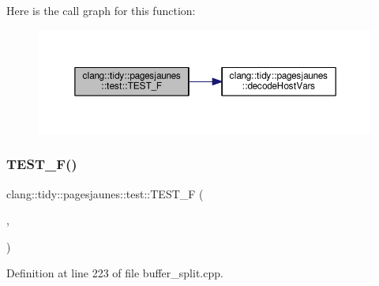 Here is the call graph for this function\+:
\nopagebreak
\begin{figure}[H]
\begin{center}
\leavevmode
\includegraphics[width=350pt]{namespaceclang_1_1tidy_1_1pagesjaunes_1_1test_ab140ea948434f84c1119e3df2cf8fb26_cgraph}
\end{center}
\end{figure}
\mbox{\label{namespaceclang_1_1tidy_1_1pagesjaunes_1_1test_ad1f201f476aa94ca49f994481cb11c99}} 
\subsubsection{\texorpdfstring{T\+E\+S\+T\+\_\+\+F()}{TEST\_F()}\hspace{0.1cm}{\footnotesize\ttfamily [48/57]}}
{\footnotesize\ttfamily clang\+::tidy\+::pagesjaunes\+::test\+::\+T\+E\+S\+T\+\_\+F (\begin{DoxyParamCaption}\item[{\hyperlink{classclang_1_1tidy_1_1pagesjaunes_1_1test_1_1_buffer_split_test}{Buffer\+Split\+Test}}]{,  }\item[{Read\+Write\+Splitted\+Buffer}]{ }\end{DoxyParamCaption})}



Definition at line 223 of file buffer\+\_\+split.\+cpp.


